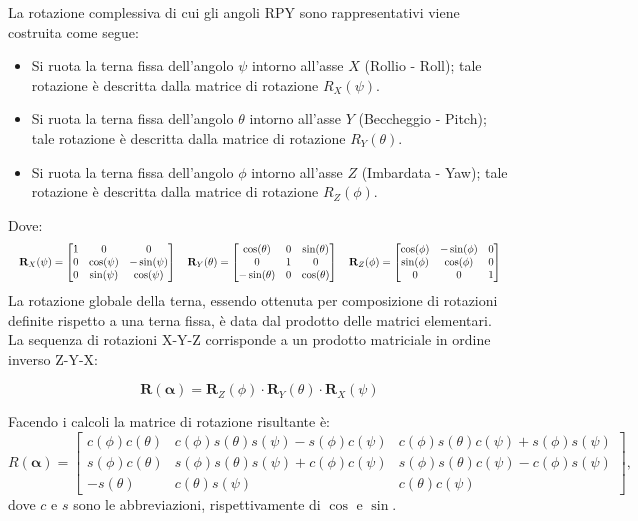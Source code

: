 \documentclass[11pt, a4paper]{report}
\begin{document}
La rotazione complessiva di cui gli angoli RPY sono rappresentativi viene costruita come segue:
\begin{itemize}
    \item Si ruota la terna fissa dell'angolo $\psi$ intorno all'asse $X$ (Rollio - Roll); tale rotazione è descritta dalla matrice di rotazione $R_X(\psi)$.
    \item Si ruota la terna fissa dell'angolo $\theta$ intorno all'asse $Y$ (Beccheggio - Pitch); tale rotazione è descritta dalla matrice di rotazione $R_Y(\theta)$.
    \item Si ruota la terna fissa dell'angolo $\phi$ intorno all'asse $Z$ (Imbardata - Yaw); tale rotazione è descritta dalla matrice di rotazione $R_Z(\phi)$.
\end{itemize}
Dove:
\[
\resizebox{\linewidth}{!}{$
    \displaystyle
    \mathbf{R}_{X}(\psi) =
    \begin{bmatrix}
        1 & 0 & 0 \\
        0 & \cos(\psi) & -\sin(\psi) \\
        0 & \sin(\psi) & \cos(\psi)
    \end{bmatrix}
    \quad
    \mathbf{R}_{Y}(\theta) =
    \begin{bmatrix}
        \cos(\theta) & 0 & \sin(\theta) \\
        0 & 1 & 0 \\
        -\sin(\theta) & 0 & \cos(\theta)
    \end{bmatrix}
    \quad
    \mathbf{R}_{Z}(\phi) =
    \begin{bmatrix}
        \cos(\phi) & -\sin(\phi) & 0 \\
        \sin(\phi) & \cos(\phi) & 0 \\
        0 & 0 & 1
    \end{bmatrix}
$}
\]
La rotazione globale della terna, essendo ottenuta per composizione di rotazioni definite rispetto a una terna fissa, è data dal prodotto delle matrici elementari. La sequenza di rotazioni X-Y-Z corrisponde a un prodotto matriciale in ordine inverso Z-Y-X:

\[
    \mathbf{R}(\boldsymbol{\alpha}) = \mathbf{R}_{Z}(\phi) \cdot  \mathbf{R}_{Y}(\theta) \cdot \mathbf{R}_{X}(\psi)
\]

Facendo i calcoli la matrice di rotazione risultante è:
\[
    R(\boldsymbol{\alpha}) =
    \begin{bmatrix}
        c(\phi) c(\theta) & c(\phi) s(\theta) s(\psi) - s(\phi) c(\psi) & c(\phi) s(\theta) c(\psi) + s(\phi) s(\psi) \\
        s(\phi) c(\theta) & s(\phi) s(\theta) s(\psi) + c(\phi) c(\psi) & s(\phi) s(\theta) c(\psi) - c(\phi) s(\psi) \\
        -s(\theta) & c(\theta) s(\psi) & c(\theta) c(\psi)
    \end{bmatrix},
\]
dove $c$ e $s$ sono le abbreviazioni, rispettivamente di $\cos$ e $\sin$.
\end{document}
